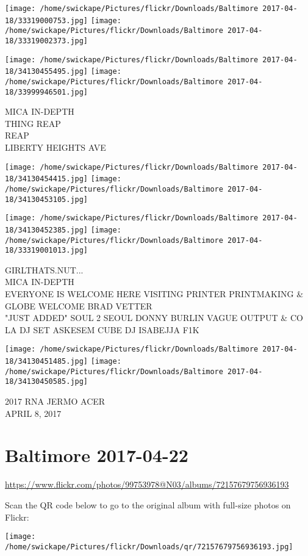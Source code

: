 \documentclass[10pt,letterpaper]{article}
\begin{document}
\texttt{[image: /home/swickape/Pictures/flickr/Downloads/Baltimore 2017-04-18/33319000753.jpg]}
\texttt{[image: /home/swickape/Pictures/flickr/Downloads/Baltimore 2017-04-18/33319002373.jpg]}

\texttt{[image: /home/swickape/Pictures/flickr/Downloads/Baltimore 2017-04-18/34130455495.jpg]}
\texttt{[image: /home/swickape/Pictures/flickr/Downloads/Baltimore 2017-04-18/33999946501.jpg]}

MICA IN{-}DEPTH\\
THING REAP\\
REAP\\
LIBERTY HEIGHTS AVE
\pagebreak

\texttt{[image: /home/swickape/Pictures/flickr/Downloads/Baltimore 2017-04-18/34130454415.jpg]}
\texttt{[image: /home/swickape/Pictures/flickr/Downloads/Baltimore 2017-04-18/34130453105.jpg]}

\texttt{[image: /home/swickape/Pictures/flickr/Downloads/Baltimore 2017-04-18/34130452385.jpg]}
\texttt{[image: /home/swickape/Pictures/flickr/Downloads/Baltimore 2017-04-18/33319001013.jpg]}

GIRLTHATS.NUT...\\
MICA IN{-}DEPTH\\
EVERYONE IS WELCOME HERE VISITING PRINTER PRINTMAKING \& GLOBE WELCOME BRAD VETTER\\
"JUST ADDED" SOUL 2 SEOUL DONNY BURLIN VAGUE OUTPUT \& CO LA DJ SET ASKESEM CUBE DJ ISABEJJA F1K
\pagebreak

\texttt{[image: /home/swickape/Pictures/flickr/Downloads/Baltimore 2017-04-18/34130451485.jpg]}
\texttt{[image: /home/swickape/Pictures/flickr/Downloads/Baltimore 2017-04-18/34130450585.jpg]}

2017 RNA JERMO ACER\\
APRIL 8, 2017
\pagebreak

\section*{Baltimore 2017-04-22}

\url{https://www.flickr.com/photos/99753978@N03/albums/72157679756936193}

Scan the QR code below to go to the original album with full-size photos on Flickr:

\texttt{[image: /home/swickape/Pictures/flickr/Downloads/qr/72157679756936193.jpg]}
\pagebreak
\end{document}
